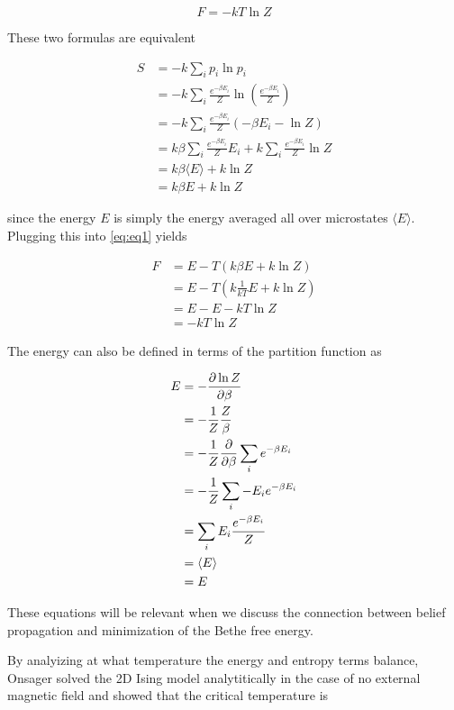 \documentclass{article}
\begin{document}
\begin{equation}
    F = -kT \ln Z
\end{equation}

These two formulas are equivalent


\begin{align}
    S &= -k \sum_i p_i \ln p_i \\
    &= -k \sum_i \frac{e^{-\beta E_i}}{Z} \ln \left(\frac{e^{-\beta E_i}}{Z} \right) \\
    &= -k \sum_i \frac{e^{-\beta E_i}}{Z} (-\beta E_i - \ln Z) \\
    &= k \beta \sum_i \frac{e^{-\beta E_i}}{Z} E_i + k \sum_i \frac{e^{-\beta E_i}}{Z} \ln Z \\
    &= k \beta \langle E \rangle + k \ln Z \\
    &= k \beta E + k \ln Z
\end{align}

since the energy $E$ is simply the energy averaged all over microstates $\langle E \rangle$. 
Plugging this into \eqref{eq:eq1} yields

\begin{align}
    F &= E - T (k \beta E + k \ln Z) \\
    &= E - T (k \frac{1}{kT} E + k \ln Z) \\
    &= E - E - kT \ln Z \\
    &= -kT \ln Z
\end{align}

The energy can also be defined in terms of the partition function as

\begin{align}
    E &= -\pdv{\ln Z}{\beta} \\
    &= -\frac{1}{Z} \frac{Z}{\beta} \\
    &= -\frac{1}{Z} \pdv{}{\beta} \sum_i e^{-\beta E_i} \\
    &= -\frac{1}{Z} \sum_i -E_i e^{-\beta E_i} \\
    &= \sum_i E_i \frac{e^{-\beta E_i}}{Z} \\
    &= \langle E \rangle \\
    &= E 
\end{align}

These equations will be relevant when we discuss the connection between belief propagation and minimization of the Bethe free energy.

By analyizing at what temperature the energy and entropy terms balance, Onsager solved the 2D Ising model analytitically in the case of no external magnetic field and showed that the critical temperature is
\end{document}
